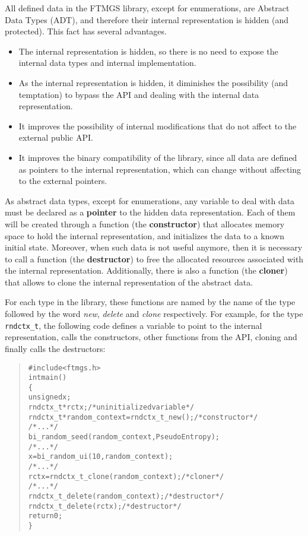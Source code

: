 \documentclass[a4paper]{article}
\newenvironment{code}%
{\begin{quote}\footnotesize\begin{alltt}}%
{\end{alltt}\end{quote}}%
\begin{document}
All defined data in the FTMGS library, except for enumerations, are
Abstract Data Types (ADT), and therefore their internal representation
is hidden (and protected). This fact has several advantages. 

{\footnotesize\begin{itemize}%
\item The internal representation is hidden, so there is no need to
  expose the internal data types and internal implementation.
\item As the internal representation is hidden, it diminishes the
  possibility (and temptation) to bypass the API and dealing with the
  internal data representation.
\item It improves the possibility of internal modifications that do
  not affect to the external public API.
\item It improves the binary compatibility of the library, since all
  data are defined as pointers to the internal representation, which
  can change without affecting to the external pointers.
\end{itemize}}%

As abstract data types, except for enumerations, any variable to deal
with data must be declared as a \textbf{pointer} to the hidden data
representation. Each of them will be created through a function (the
\textbf{constructor}) that allocates memory space to hold the internal
representation, and initializes the data to a known initial
state. Moreover, when such data is not useful anymore, then it is
necessary to call a function (the \textbf{destructor}) to free the
allocated resources associated with the internal
representation. Additionally, there is also a function (the
\textbf{cloner}) that allows to clone the internal representation of
the abstract data.

For each type in the library, these functions are named by the name of
the type followed by the word \emph{new}, \emph{delete} and
\emph{clone} respectively. For example, for the type \verb|rndctx_t|,
the following code defines a variable to point to the internal
representation, calls the constructors, other functions from the API,
cloning and finally calls the destructors:
\begin{code}
#include <ftmgs.h>
int main()
\{
    unsigned x;
    rndctx_t* rctx;                             /* uninitialized variable */
    rndctx_t* random_context = rndctx_t_new();  /* constructor */
    /* ... */
    bi_random_seed(random_context, PseudoEntropy);
    /* ... */
    x = bi_random_ui(10, random_context);
    /* ... */
    rctx = rndctx_t_clone(random_context);      /* cloner     */
    /* ... */
    rndctx_t_delete(random_context);            /* destructor */
    rndctx_t_delete(rctx);                      /* destructor */
    return 0;
\}
\end{code}
\end{document}
